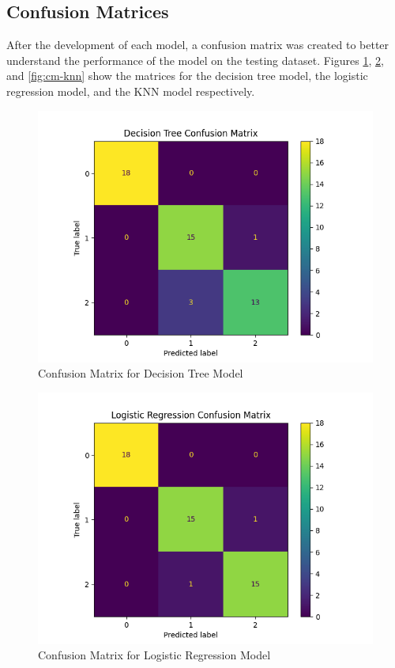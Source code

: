 \documentclass[journal]{IEEEtran}
\begin{document}
\subsection{Confusion Matrices}

After the development of each model, a confusion matrix was created to better understand the performance of the model on the testing dataset. Figures \ref{fig:cm-dtree}, \ref{fig:cm-logreg}, and \ref{fig:cm-knn} show the matrices for the decision tree model, the logistic regression model, and the KNN model respectively. 

\begin{figure}[h!]
\includegraphics[scale=.5]{dtree_cm.png}
\centering
\caption{Confusion Matrix for Decision Tree Model}
\label{fig:cm-dtree}
\end{figure}

\begin{figure}[h!]
\includegraphics[scale=.5]{logR_cm.png}
\centering
\caption{Confusion Matrix for Logistic Regression Model}
\label{fig:cm-logreg}
\end{figure}
\end{document}
